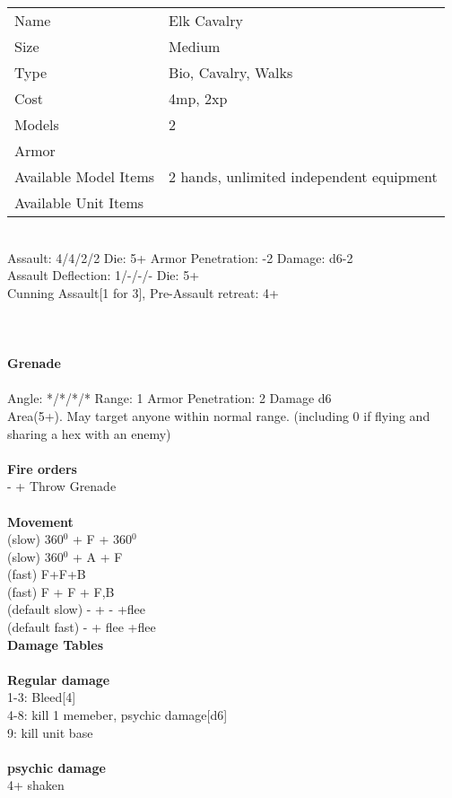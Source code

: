 \begin{tabular}{ll}
  Name & Elk Cavalry \\
  Size & Medium\\
  Type & Bio, Cavalry, Walks\\
  Cost & 4mp, 2xp\\
  Models & 2\\
  Armor & \\
  Available Model Items & 2 hands, unlimited independent equipment \\
  Available Unit Items &  \\
\end{tabular}

\ \\
Assault: 4/4/2/2 Die: 5+ Armor Penetration: -2 Damage: d6-2 \\
Assault Deflection: 1/-/-/- Die: 5+\\
\indent Cunning Assault[1 for 3], Pre-Assault retreat: 4+ \\
\ \\

\ \\
\ \\
{\bf Grenade } \\
\ \\
Angle: */*/*/* Range: 1 Armor Penetration: 2 Damage d6 \\
\indent Area(5+). May target anyone within normal range. (including 0 if flying and sharing a hex with an enemy) \\





\ \\ {\bf Fire orders } \\
- + Throw Grenade \\
\ \\ {\bf Movement } \\
(slow) 360$^0$ + F + 360$^0$ \\
(slow) 360$^0$ + A + F \\
(fast) F+F+B \\
(fast) F + F + F,B \\
(default slow) - + - +flee \\
(default fast) - + flee +flee \\



{\bf Damage Tables} \\
\ \\ {\bf Regular damage } \\
1-3: Bleed[4] \\
4-8: kill 1 memeber, psychic damage[d6] \\
9: kill unit base \\
\ \\ {\bf psychic damage } \\
4+ shaken \\


